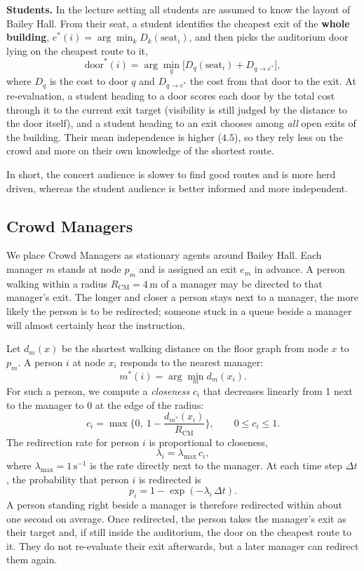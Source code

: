 \documentclass{article}
\begin{document}
\textbf{Students.} In the lecture setting all students are assumed to know the layout of Bailey Hall. From their seat, a student identifies the cheapest exit of the \textbf{whole building}, $e^\ast(i)=\arg\min_{k} D_k(\text{seat}_i)$, and then picks the auditorium door lying on the cheapest route to it,
\begin{equation}
    \text{door}^\ast(i) = \arg\min_q \big[ D_q(\text{seat}_i) + D_{q \to e^\ast}\big],
\end{equation}
where $D_q$ is the cost to door $q$ and $D_{q\to e^\ast}$ the cost from that door to the exit. At re-evaluation, a student heading to a door scores each door by the total cost through it to the current exit target (visibility is still judged by the distance to the door itself), and a student heading to an exit chooses among \emph{all} open exits of the building. Their mean independence is higher ($4.5$), so they rely less on the crowd and more on their own knowledge of the shortest route.

In short, the concert audience is slower to find good routes and is more herd driven, whereas the student audience is better informed and more independent.

\subsection{Crowd Managers}
\label{sec:managers}
We place Crowd Managers as stationary agents around Bailey Hall. Each manager $m$ stands at node $p_m$ and is assigned an exit $e_m$ in advance. A person walking within a radius $R_{\mathrm{CM}} = 4$\,m of a manager may be directed to that manager's exit. The longer and closer a person stays next to a manager, the more likely the person is to be redirected; someone stuck in a queue beside a manager will almost certainly hear the instruction.

Let $d_m(x)$ be the shortest walking distance on the floor graph from node $x$ to $p_m$. A person $i$ at node $x_i$ responds to the nearest manager:
\[
m^*(i) = \arg\min_m d_m(x_i).
\]
For such a person, we compute a \emph{closeness} $c_i$ that decreases linearly from 1 next to the manager to 0 at the edge of the radius:
\[
c_i = \max\Big\{0,\ 1 - \frac{d_{m^*}(x_i)}{R_{\mathrm{CM}}}\Big\}, \qquad 0 \le c_i \le 1 .
\]
The redirection rate for person $i$ is proportional to closeness,
\[
\lambda_i= \lambda_{\max} \, c_i ,
\]
where $\lambda_{\max} = 1\,\mathrm{s}^{-1}$ is the rate directly next to the manager. At each time step $\Delta t$, the probability that person $i$ is redirected is
\[
p_i = 1 - \exp(-\lambda_i \, \Delta t).
\]
A person standing right beside a manager is therefore redirected within about one second on average. Once redirected, the person takes the manager's exit as their target and, if still inside the auditorium, the door on the cheapest route to it. They do not re-evaluate their exit afterwards, but a later manager can redirect them again.
\end{document}
